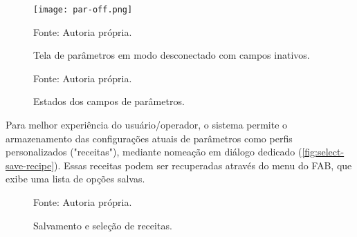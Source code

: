 \begin{figure}[ht]
    \centering
    \caption{Tela de parâmetros em modo desconectado com campos inativos.}
    \label{fig:par-off}
    \texttt{[image: par-off.png]}

    {\centering\footnotesize Fonte: Autoria própria.\par}
\end{figure}

\begin{figure}[ht]
    \caption{Estados dos campos de parâmetros.}
    \label{fig:parameters-state}
    \centering
    \hfill
    \hfill
    \hfill
    \hfill

    {\centering\footnotesize Fonte: Autoria própria.\par}

  \end{figure}


Para melhor experiência do usuário/operador, o sistema permite o armazenamento das configurações atuais de parâmetros como perfis personalizados ("receitas"), mediante nomeação em diálogo dedicado (\autoref{fig:select-save-recipe}). Essas receitas podem ser recuperadas através do menu do FAB, que exibe uma lista de opções salvas.

\begin{figure}[ht]
    \caption{Salvamento e seleção de receitas.}
    \label{fig:select-save-recipe}
    \centering
    \hfill
    \hfill
    \hfill

    {\centering\footnotesize Fonte: Autoria própria.\par}

  \end{figure}

